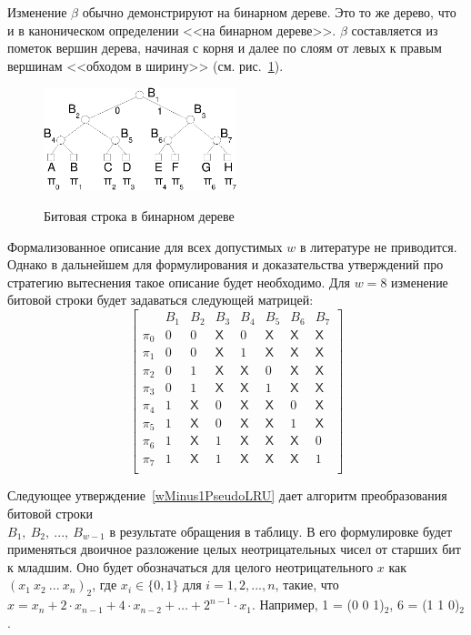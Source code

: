 Изменение $\beta$ обычно демонстрируют на бинарном дереве. Это то же дерево, что и в каноническом определении \PseudoLRU <<на бинарном дереве>>. $\beta$ составляется из пометок вершин дерева, начиная с корня и далее по слоям от левых к правым вершинам <<обходом в ширину>> (см. рис.~\ref{plru_bittree}).

\begin{figure}[h] \center
  \includegraphics[width=0.5\textwidth]{2.theor/plru}\\
  \caption{Битовая строка в бинарном дереве}\label{plru_bittree}
\end{figure}

Формализованное описание для всех допустимых $w$ в литературе не
приводится. Однако в дальнейшем для формулирования и доказательства
утверждений про стратегию вытеснения \PseudoLRU такое описание будет
необходимо. Для $w=8$ изменение битовой строки будет задаваться следующей матрицей:
$$
\left[
  \begin{array}{c|ccccccc}
          & B_1 & B_2 & B_3 & B_4 & B_5 & B_6 & B_7 \\ \hline
    \pi_0 & 0 & 0 & \textsf{X} & 0 & \textsf{X} & \textsf{X} & \textsf{X} \\
    \pi_1 & 0 & 0 & \textsf{X} & 1 & \textsf{X} & \textsf{X} & \textsf{X} \\
    \pi_2 & 0 & 1 & \textsf{X} & \textsf{X} & 0 & \textsf{X} & \textsf{X} \\
    \pi_3 & 0 & 1 & \textsf{X} & \textsf{X} & 1 & \textsf{X} & \textsf{X} \\
    \pi_4 & 1 & \textsf{X} & 0 & \textsf{X} & \textsf{X} & 0 & \textsf{X} \\
    \pi_5 & 1 & \textsf{X} & 0 & \textsf{X} & \textsf{X} & 1 & \textsf{X} \\
    \pi_6 & 1 & \textsf{X} & 1 & \textsf{X} & \textsf{X} & \textsf{X} & 0 \\
    \pi_7 & 1 & \textsf{X} & 1 & \textsf{X} & \textsf{X} & \textsf{X} & 1 \\
  \end{array}
\right]
$$

Следующее утверждение~\ref{wMinus1PseudoLRU} дает алгоритм
преобразования битовой строки\\ $B_1,~B_2,~...,~B_{w{-}1}$ в результате
обращения в таблицу. В его формулировке будет применяться двоичное
разложение целых неотрицательных чисел от старших бит к младшим. Оно будет обозначаться для целого неотрицательного $x$ как $(x_1~x_2~...~x_n)_2$, где $x_i \in \{0, 1\}$ для $i = 1, 2, ..., n$, такие, что $x = x_n + 2{\cdot}x_{n-1} + 4{\cdot}x_{n-2} + \dots + 2^{n-1}{\cdot}x_1$. Например, 1 = (0 0 1)$_2$, 6 = (1 1 0)$_2$.


